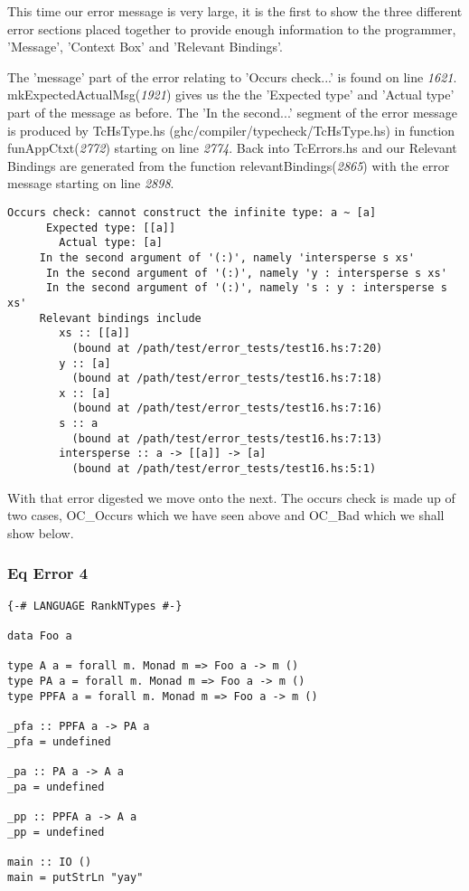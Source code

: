 \documentclass[a4paper]{article}
\begin{document}
This time our error message is very large, it is the first to show the three different error sections placed together to provide enough information to the programmer, 'Message', 'Context Box' and 'Relevant Bindings'.  

The 'message' part of the error relating to 'Occurs check...' is found on line \textit{1621}.  mkExpectedActualMsg(\textit{1921})  gives us the the 'Expected type' and 'Actual type' part of the message as before. The 'In the second...' segment of the error message is produced by TcHsType.hs
(ghc/compiler/typecheck/TcHsType.hs) in function funAppCtxt(\textit{2772}) starting on line \textit{2774}. Back into TcErrors.hs and our Relevant Bindings are generated from the function relevantBindings(\textit{2865}) with the error message starting on line \textit{2898}.

\hfill \break
\hfill \break
\hfill \break
\hfill \break
\hfill \break
\hfill \break
\begin{lstlisting}[label={lst: T9.0.2}, numbers=none, caption={Error}]
Occurs check: cannot construct the infinite type: a ~ [a]
      Expected type: [[a]]
        Actual type: [a]
     In the second argument of '(:)', namely 'intersperse s xs'
      In the second argument of '(:)', namely 'y : intersperse s xs'
      In the second argument of '(:)', namely 's : y : intersperse s xs'
     Relevant bindings include
        xs :: [[a]]
          (bound at /path/test/error_tests/test16.hs:7:20)
        y :: [a]
          (bound at /path/test/error_tests/test16.hs:7:18)
        x :: [a]
          (bound at /path/test/error_tests/test16.hs:7:16)
        s :: a
          (bound at /path/test/error_tests/test16.hs:7:13)
        intersperse :: a -> [[a]] -> [a]
          (bound at /path/test/error_tests/test16.hs:5:1)
\end{lstlisting}

With that error digested we move onto the next. The occurs check is made up of two cases, OC\_Occurs which we have seen above and OC\_Bad which we shall show below. 

\subsubsection{Eq Error 4}

\begin{lstlisting}[label={lst: T10.0}, numbers=none, caption={Example Program \cite{ex10}}]
{-# LANGUAGE RankNTypes #-}

data Foo a

type A a = forall m. Monad m => Foo a -> m ()
type PA a = forall m. Monad m => Foo a -> m ()
type PPFA a = forall m. Monad m => Foo a -> m ()

_pfa :: PPFA a -> PA a
_pfa = undefined

_pa :: PA a -> A a
_pa = undefined

_pp :: PPFA a -> A a
_pp = undefined

main :: IO ()
main = putStrLn "yay"
\end{lstlisting}
\end{document}
